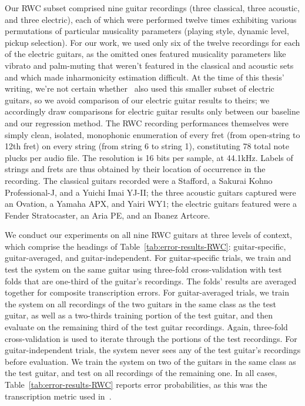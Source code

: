 \documentclass[12pt]{cmuthesis}
\begin{document}
Our RWC subset comprised nine guitar recordings (three classical, three acoustic, and three electric), each of which were performed twelve times exhibiting various permutations of particular musicality parameters (playing style, dynamic level, pickup selection). For our work, we used only six of the twelve recordings for each of the electric guitars, as the omitted ones featured musicality parameters like vibrato and palm-muting that weren't featured in the classical and acoustic sets and which made inharmonicity estimation difficult. At the time of this thesis' writing, we're not certain whether~\cite{barbanchoi2012} also used this smaller subset of electric guitars, so we avoid comparison of our electric guitar results to theirs; we accordingly draw comparisons for electric guitar results only between our baseline and our regression method. The RWC recording performances themselves were simply clean, isolated, monophonic enumeration of every fret (from open-string to 12th fret) on every string (from string 6 to string 1), constituting 78 total note plucks per audio file. The resolution is 16 bits per sample, at 44.1kHz. Labels of strings and frets are thus obtained by their location of occurrence in the recording. The classical guitars recorded were a Stafford, a Sakurai Kohno Professional-J, and a Yuichi Imai YJ-II; the three acoustic guitars captured were an Ovation, a Yamaha APX, and Yairi WY1; the electric guitars featured were a Fender Stratocaster, an Aria PE, and an Ibanez Artcore.


We conduct our experiments on all nine RWC guitars at three levels of context, which comprise the headings of Table~\ref{tab:error-results-RWC}: guitar-specific, guitar-averaged, and guitar-independent. For guitar-specific trials, we train and test the system on the same guitar using three-fold cross-validation with test folds that are one-third of the guitar's recordings. The folds' results are averaged together for composite transcription errors. For guitar-averaged trials, we train the system on all recordings of the two guitars in the same class as the test guitar, as well as a two-thirds training portion of the test guitar, and then evaluate on the remaining third of the test guitar recordings. Again, three-fold cross-validation is used to iterate through the portions of the test recordings. For guitar-independent trials, the system never sees any of the test guitar's recordings before evaluation. We train the system on two of the guitars in the same class as the test guitar, and test on all recordings of the remaining one. In all cases, Table~\ref{tab:error-results-RWC} reports error probabilities, as this was the transcription metric used in~\cite{barbanchoi2012}.
\end{document}
